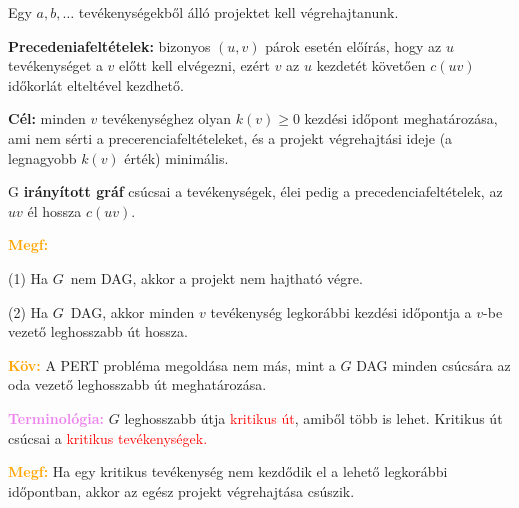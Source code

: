 \documentclass[../../szobeli.tex]{subfiles}
\begin{document}
\begin{itemize}
        Egy $a,b,\dots$ tevékenységekből álló projektet kell végrehajtanunk. 

        \textbf{Precedeniafeltételek:} bizonyos $(u,v)$ párok esetén előírás, hogy az $u$ tevékenységet a $v$ előtt kell elvégezni, ezért $v$ az $u$ kezdetét követően $c(uv)$ időkorlát elteltével kezdhető.

        \textbf{Cél:} minden $v$ tevékenységhez olyan $k(v) \geq 0$ kezdési időpont meghatározása, ami nem sérti a precerenciafeltételeket, és a projekt végrehajtási ideje (a legnagyobb $k(v)$ érték) minimális.

        G \textbf{irányított gráf} csúcsai a tevékenységek, élei pedig a precedenciafeltételek, az $uv$ él hossza $c(uv)$.

        \textcolor{orange}{\textbf{Megf:}} 
        
        (1) Ha $G$ nem DAG, akkor a projekt nem hajtható végre. 
        
        (2) Ha $G$ DAG, akkor minden $v$ tevékenység legkorábbi kezdési időpontja a $v$-be vezető leghosszabb út hossza.

        \textcolor{orange}{\textbf{Köv:}} A PERT probléma megoldása nem más, mint a $G$ DAG minden csúcsára az oda vezető leghosszabb út meghatározása.

        \textcolor{violet}{\textbf{Terminológia:}} $G$ leghosszabb útja \textcolor{red}{kritikus út}, amiből több is lehet. Kritikus út csúcsai a \textcolor{red}{kritikus tevékenységek.}

        \textcolor{orange}{\textbf{Megf:}} Ha egy kritikus tevékenység nem kezdődik el a lehető legkorábbi időpontban, akkor az egész projekt végrehajtása csúszik.


    \end{itemize}
\end{document}
